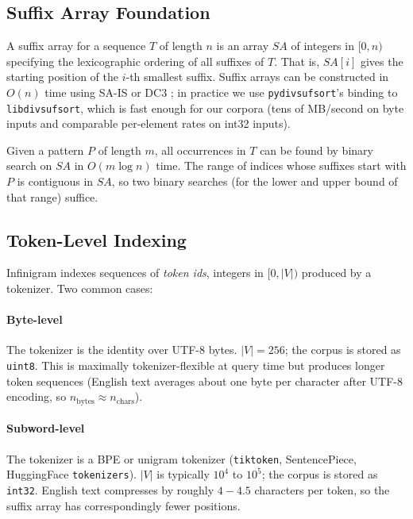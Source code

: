 \documentclass[11pt]{article}
\begin{document}
\subsection{Suffix Array Foundation}

A suffix array \citep{manber1993suffix} for a sequence $T$ of length $n$ is an array $SA$ of integers in $[0, n)$ specifying the lexicographic ordering of all suffixes of $T$. That is, $SA[i]$ gives the starting position of the $i$-th smallest suffix. Suffix arrays can be constructed in $O(n)$ time using SA-IS \citep{nong2009sais} or DC3 \citep{karkkainen2003dc3}; in practice we use \texttt{pydivsufsort}'s binding to \texttt{libdivsufsort}, which is fast enough for our corpora (tens of MB/second on byte inputs and comparable per-element rates on int32 inputs).

Given a pattern $P$ of length $m$, all occurrences in $T$ can be found by binary search on $SA$ in $O(m \log n)$ time. The range of indices whose suffixes start with $P$ is contiguous in $SA$, so two binary searches (for the lower and upper bound of that range) suffice.

\subsection{Token-Level Indexing}

Infinigram indexes sequences of \emph{token ids}, integers in $[0, |V|)$ produced by a tokenizer. Two common cases:

\paragraph{Byte-level} The tokenizer is the identity over UTF-8 bytes. $|V| = 256$; the corpus is stored as \texttt{uint8}. This is maximally tokenizer-flexible at query time but produces longer token sequences (English text averages about one byte per character after UTF-8 encoding, so $n_\text{bytes} \approx n_\text{chars}$).

\paragraph{Subword-level} The tokenizer is a BPE or unigram tokenizer (\texttt{tiktoken}, SentencePiece, HuggingFace \texttt{tokenizers}). $|V|$ is typically $10^4$ to $10^5$; the corpus is stored as \texttt{int32}. English text compresses by roughly $4{-}4.5$ characters per token, so the suffix array has correspondingly fewer positions.
\end{document}
